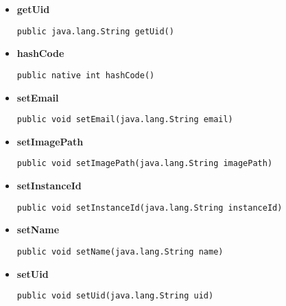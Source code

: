 \documentclass[11pt,a4paper]{report}
\begin{document}
{{{{{{{\begin{itemize}
{\hypertarget{edu.kit.pse17.go_app.PersistenceLayer.UserEntity.getName()}{{\bf  getName}\\}
\begin{lstlisting}[frame=none]
public java.lang.String getName()\end{lstlisting} %
}%
\item{ 
\hypertarget{edu.kit.pse17.go_app.PersistenceLayer.UserEntity.getUid()}{{\bf  getUid}\\}
\begin{lstlisting}[frame=none]
public java.lang.String getUid()\end{lstlisting} %
}%
\item{ 
\hypertarget{edu.kit.pse17.go_app.PersistenceLayer.UserEntity.hashCode()}{{\bf  hashCode}\\}
\begin{lstlisting}[frame=none]
public native int hashCode()\end{lstlisting} %
}%
\item{ 
\hypertarget{edu.kit.pse17.go_app.PersistenceLayer.UserEntity.setEmail(java.lang.String)}{{\bf  setEmail}\\}
\begin{lstlisting}[frame=none]
public void setEmail(java.lang.String email)\end{lstlisting} %
}%
\item{ 
\hypertarget{edu.kit.pse17.go_app.PersistenceLayer.UserEntity.setImagePath(java.lang.String)}{{\bf  setImagePath}\\}
\begin{lstlisting}[frame=none]
public void setImagePath(java.lang.String imagePath)\end{lstlisting} %
}%
\item{ 
\hypertarget{edu.kit.pse17.go_app.PersistenceLayer.UserEntity.setInstanceId(java.lang.String)}{{\bf  setInstanceId}\\}
\begin{lstlisting}[frame=none]
public void setInstanceId(java.lang.String instanceId)\end{lstlisting} %
}%
\item{ 
\hypertarget{edu.kit.pse17.go_app.PersistenceLayer.UserEntity.setName(java.lang.String)}{{\bf  setName}\\}
\begin{lstlisting}[frame=none]
public void setName(java.lang.String name)\end{lstlisting} %
}%
\item{ 
\hypertarget{edu.kit.pse17.go_app.PersistenceLayer.UserEntity.setUid(java.lang.String)}{{\bf  setUid}\\}
\begin{lstlisting}[frame=none]
public void setUid(java.lang.String uid)\end{lstlisting} %
}%
\end{itemize}
}
}
}
}}}}
\end{document}

